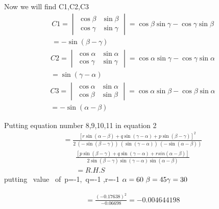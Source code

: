 \documentclass[journal,12pt,twocolumn]{IEEEtran}
\begin{document}
Now we will find C1,C2,C3
\begin{multline}
    C1=\begin{vmatrix}\cos\beta & \sin\beta\\ \cos\gamma&\sin\gamma \end{vmatrix}=\cos\beta\sin\gamma -\cos\gamma\sin\beta\\ =-\sin(\beta-\gamma)
\end{multline}
\begin{multline}
    C2=\begin{vmatrix}\cos\alpha & \sin\alpha\\ \cos\gamma&\sin\gamma \end{vmatrix}=\cos\alpha\sin\gamma -\cos\gamma\sin\alpha\\ =\sin(\gamma-\alpha)
\end{multline}
\begin{multline}    
C3=\begin{vmatrix}\cos\alpha & \sin\alpha\\ \cos\beta&\sin\beta \end{vmatrix}=\cos\alpha\sin\beta -\cos\beta\sin\alpha\\ =-\sin(\alpha-\beta)
\end{multline}

Putting equation number 8,9,10,11 in equation 2
\begin{multline}
= \frac{ [r\sin(\alpha-\beta)+ q\sin(\gamma-\alpha) + p \sin(\beta-\gamma)]^2}{2~(-\sin(\beta-\gamma))~(\sin(\gamma-\alpha))~(-\sin(\alpha-\beta))}    
\end{multline}
\begin{multline}
    \frac{\left[ p\sin(\beta-\gamma) +q\sin(\gamma-\alpha)+r sin(\alpha-\beta)\right] }{2\sin(\beta-\gamma) \sin(\gamma-\alpha)\sin(\alpha-\beta)}\\=R.H.S
\end{multline}
putting~ value~ of~p=-1,~q=-1 ,r=-1$~\alpha=60~\beta=45 \\ \gamma=30$

\begin{multline}
=\frac{(-0.17638)^2}{-0.06698}=-0.004644198\\
\end{multline}
\end{document}
